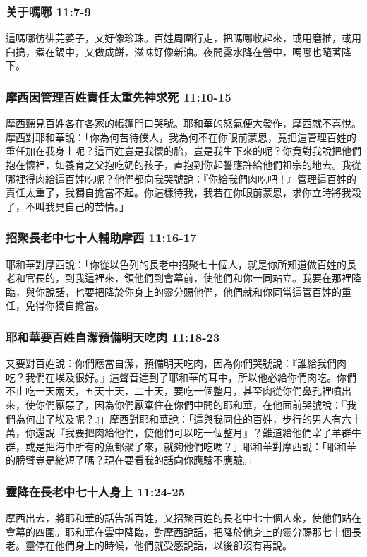 \subsubsection{关于嗎哪 11:7-9}
這嗎哪彷彿芫荽子，又好像珍珠。百姓周圍行走，把嗎哪收起來，或用磨推，或用臼搗，煮在鍋中，又做成餅，滋味好像新油。夜間露水降在營中，嗎哪也隨著降下。

\subsubsection{摩西因管理百姓責任太重先神求死 11:10-15}
摩西聽見百姓各在各家的帳篷門口哭號。耶和華的怒氣便大發作，摩西就不喜悅。摩西對耶和華說：「你為何苦待僕人，我為何不在你眼前蒙恩，竟把這管理百姓的重任加在我身上呢？這百姓豈是我懷的胎，豈是我生下來的呢？你竟對我說把他們抱在懷裡，如養育之父抱吃奶的孩子，直抱到你起誓應許給他們祖宗的地去。我從哪裡得肉給這百姓吃呢？他們都向我哭號說：『你給我們肉吃吧！』管理這百姓的責任太重了，我獨自擔當不起。你這樣待我，我若在你眼前蒙恩，求你立時將我殺了，不叫我見自己的苦情。」

\subsubsection{招聚長老中七十人輔助摩西 11:16-17}
耶和華對摩西說：「你從以色列的長老中招聚七十個人，就是你所知道做百姓的長老和官長的，到我這裡來，領他們到會幕前，使他們和你一同站立。我要在那裡降臨，與你說話，也要把降於你身上的靈分賜他們，他們就和你同當這管百姓的重任，免得你獨自擔當。

\subsubsection{耶和華要百姓自潔預備明天吃肉 11:18-23}
又要對百姓說：你們應當自潔，預備明天吃肉，因為你們哭號說：『誰給我們肉吃？我們在埃及很好。』這聲音達到了耶和華的耳中，所以他必給你們肉吃。你們不止吃一天兩天，五天十天，二十天，要吃一個整月，甚至肉從你們鼻孔裡噴出來，使你們厭惡了，因為你們厭棄住在你們中間的耶和華，在他面前哭號說：『我們為何出了埃及呢？』」摩西對耶和華說：「這與我同住的百姓，步行的男人有六十萬，你還說『我要把肉給他們，使他們可以吃一個整月』？難道給他們宰了羊群牛群，或是把海中所有的魚都聚了來，就夠他們吃嗎？」耶和華對摩西說：「耶和華的膀臂豈是縮短了嗎？現在要看我的話向你應驗不應驗。」

\subsubsection{靈降在長老中七十人身上 11:24-25}
摩西出去，將耶和華的話告訴百姓，又招聚百姓的長老中七十個人來，使他們站在會幕的四圍。耶和華在雲中降臨，對摩西說話，把降於他身上的靈分賜那七十個長老。靈停在他們身上的時候，他們就受感說話，以後卻沒有再說。

